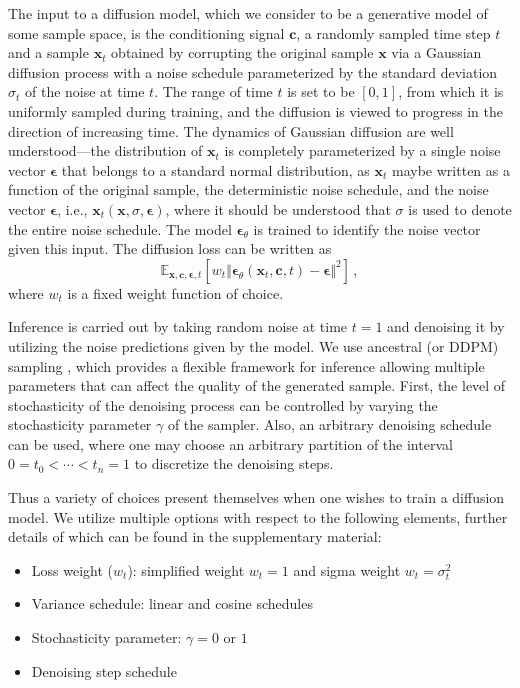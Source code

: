 The input to a diffusion model, which we consider to be a generative model of some sample space, is the conditioning signal $\mathbf{c}$, a randomly sampled time step $t$ and a sample $\mathbf{x}_t$ obtained by corrupting the original sample $\mathbf{x}$ via a Gaussian diffusion process with a noise schedule parameterized by the standard deviation $\sigma_t$ of the noise at time $t$. The range of time $t$ is set to be $[0, 1]$, from which it is uniformly sampled during training, and the diffusion is viewed to progress in the direction of increasing time. The dynamics of Gaussian diffusion are well understood---the distribution of $\mathbf{x}_t$ is completely parameterized by a single noise vector $\bm{\epsilon}$ that belongs to a standard normal distribution, as $\mathbf{x}_t$ maybe written as a function of the original sample, the deterministic noise schedule, and the noise vector $\bm{\epsilon}$, i.e., $\mathbf{x}_t(\mathbf{x}, \sigma, \bm{\epsilon})$, where it should be understood that $\sigma$ is used to denote the entire noise schedule. The model $\bm{\epsilon}_\theta$ is trained to identify the noise vector given this input. The diffusion loss can be written as
\begin{equation}
\mathbb{E}_{\mathbf{x}, \mathbf{c}, \bm{\epsilon}, t}
\left[ w_t \Vert  \bm{\epsilon}_\theta (\mathbf{x}_t, \mathbf{c}, t)- \bm{\epsilon} \Vert^2 \right] \,,
\end{equation}
where $w_t$ is a fixed weight function of choice.

Inference is carried out by taking random noise at time $t=1$ and denoising it by utilizing the noise predictions given by the model. We use ancestral (or DDPM) sampling \cite{ho2020denoising}, which provides a flexible framework for inference allowing multiple parameters that can affect the quality of the generated sample. First, the level of stochasticity of the denoising process can be controlled by varying the stochasticity parameter $\gamma$ of the sampler. Also, an arbitrary denoising schedule can be used, where one may choose an arbitrary partition of the interval $0 = t_0 < \cdots < t_n =1$ to discretize the denoising steps.

Thus a variety of choices present themselves when one wishes to train a diffusion model. We utilize multiple options with respect to the following elements, further details of which can be found in the supplementary material:
\begin{itemize}[itemsep=1pt]
\item Loss weight ($w_t$): simplified weight $w_t =1$ \cite{ho2020denoising} and sigma weight $w_t = \sigma_t^2$
\item Variance schedule: linear \cite{ho2020denoising} and cosine \cite{nichol2021improved} schedules
\item Stochasticity parameter: $\gamma= 0$ or $1$
\item Denoising step schedule
\end{itemize}

